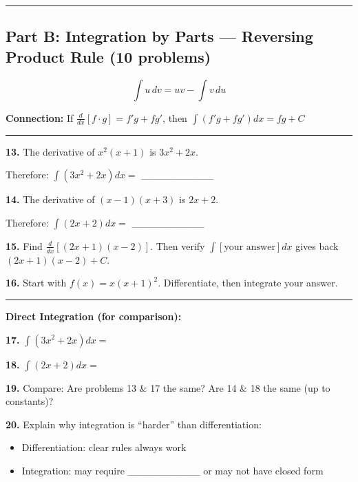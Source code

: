 \documentclass[
  11pt,
]{article}
\providecommand{\tightlist}{%
  \setlength{\itemsep}{0pt}\setlength{\parskip}{0pt}}
\begin{document}
\begin{center}\rule{0.5\linewidth}{0.5pt}\end{center}

\hypertarget{part-b-integration-by-parts-reversing-product-rule-10-problems}{%
\subsection{Part B: Integration by Parts --- Reversing Product Rule (10
problems)}\label{part-b-integration-by-parts-reversing-product-rule-10-problems}}

\[\int u \, dv = uv - \int v \, du\]

\textbf{Connection:} If \(\frac{d}{dx}[f \cdot g] = f'g + fg'\), then
\(\int (f'g + fg') dx = fg + C\)

\begin{center}\rule{0.5\linewidth}{0.5pt}\end{center}

\textbf{13.} The derivative of \(x^2(x+1)\) is \(3x^2 + 2x\).

Therefore: \(\int (3x^2 + 2x) dx ={}\) \_\_\_\_\_\_\_\_\_\_

\textbf{14.} The derivative of \((x-1)(x+3)\) is \(2x + 2\).

Therefore: \(\int (2x + 2) dx ={}\) \_\_\_\_\_\_\_\_\_\_

\textbf{15.} Find \(\frac{d}{dx}[(2x+1)(x-2)]\). Then verify
\(\int [\text{your answer}] dx\) gives back \((2x+1)(x-2) + C\).

\textbf{16.} Start with \(f(x) = x(x+1)^2\). Differentiate, then
integrate your answer.

\begin{center}\rule{0.5\linewidth}{0.5pt}\end{center}

\textbf{Direct Integration (for comparison):}

\textbf{17.} \(\int (3x^2 + 2x) dx ={}\)

\textbf{18.} \(\int (2x + 2) dx ={}\)

\textbf{19.} Compare: Are problems 13 \& 17 the same? Are 14 \& 18 the
same (up to constants)?

\textbf{20.} Explain why integration is ``harder'' than differentiation:

\begin{itemize}
\tightlist
\item
  Differentiation: clear rules always work
\item
  Integration: may require \_\_\_\_\_\_\_\_\_\_ or may not have closed
  form
\end{itemize}
\end{document}
